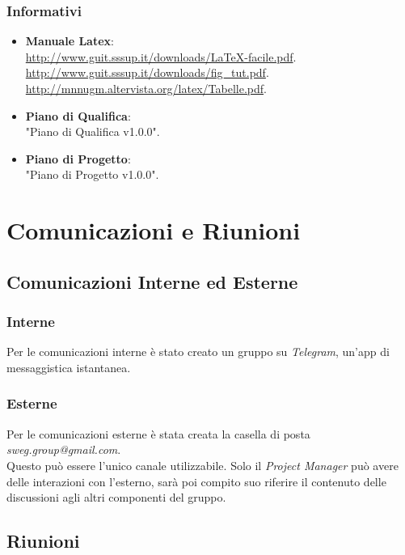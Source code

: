 \documentclass[12pt,a4paper,titlepage]{article}
\begin{document}
\subsubsection{Informativi}
\begin{itemize}
	\item \textbf{Manuale Latex}:\\
	\textcolor{blue}{\url{http://www.guit.sssup.it/downloads/LaTeX-facile.pdf}}.\\
	\textcolor{blue}{\url{http://www.guit.sssup.it/downloads/fig_tut.pdf}}.\\
	\textcolor{blue}{\url{http://mnnugm.altervista.org/latex/Tabelle.pdf}}.
	\item \textbf{Piano di Qualifica}:\\
	"Piano di Qualifica v1.0.0".
	\item \textbf{Piano di Progetto}:\\
	"Piano di Progetto v1.0.0".
\end{itemize}

\newpage
{}
\section{Comunicazioni e Riunioni}
\subsection{Comunicazioni Interne ed Esterne}
\subsubsection{Interne}
Per le comunicazioni interne è stato creato un gruppo su \textit{Telegram}, un'app di messaggistica istantanea.

\subsubsection{Esterne}
Per le comunicazioni esterne è stata creata la casella di posta \textit{sweg.group@gmail.com}.\\ 
Questo può essere l'unico canale utilizzabile. Solo il \textit{Project Manager} può avere delle interazioni con l'esterno, sarà poi compito suo riferire il contenuto delle discussioni agli altri componenti del gruppo.

\subsection{Riunioni}
\end{document}
